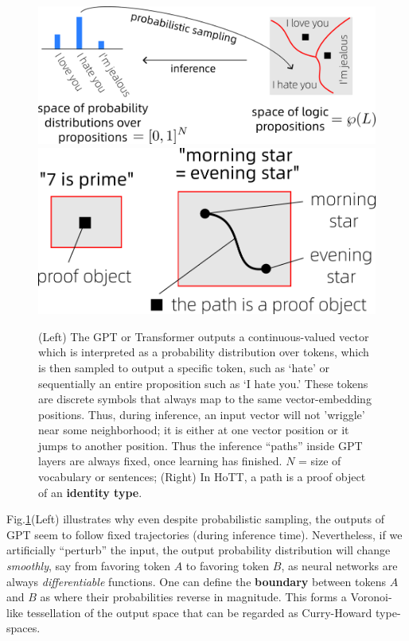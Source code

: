 \documentclass[runningheads]{llncs}
\begin{document}
\begin{figure}
	\includegraphics[scale=.45]{Transformer-output.png} \quad
	\includegraphics[scale=.35]{morning-star.png}
	\caption{(Left) The GPT or Transformer outputs a continuous-valued vector which is interpreted as a probability distribution over tokens, which is then sampled to output a specific token, such as `hate' or sequentially an entire proposition such as `I hate you.'  These tokens are discrete symbols that always map to the same vector-embedding positions.  Thus, during inference, an input vector will not 'wriggle' near some neighborhood; it is either at one vector position or it jumps to another position.  Thus the inference ``paths'' inside GPT layers are always fixed, once learning has finished.  $N$ = size of vocabulary or sentences; (Right) In HoTT, a path is a proof object of an \textbf{identity type}.}
	\label{fig:morning-star}
\end{figure}

Fig.\ref{fig:morning-star}(Left) illustrates why even despite probabilistic sampling, the outputs of GPT seem to follow fixed trajectories (during inference time).  Nevertheless, if we artificially ``perturb'' the input, the output probability distribution will change \textit{smoothly}, say from favoring token $A$ to favoring token $B$, as neural networks are always \textit{differentiable} functions.  One can define the \textbf{boundary} between tokens $A$ and $B$ as where their probabilities reverse in magnitude.  This forms a Voronoi-like tessellation of the output space that can be regarded as Curry-Howard type-spaces.
\end{document}
